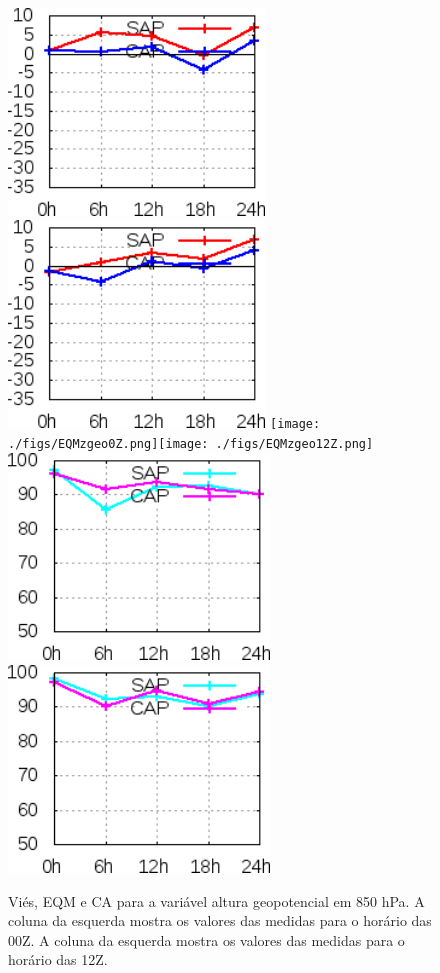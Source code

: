 \begin{figure}[!hbp]
\includegraphics[height=5.5cm]{./figs/VIES850zgeo0Z.png}\includegraphics[height=5.5cm]{./figs/VIES850zgeo12Z.png}
\texttt{[image: ./figs/EQMzgeo0Z.png]}\texttt{[image: ./figs/EQMzgeo12Z.png]}
\includegraphics[height=5.5cm]{./figs/CA850zgeo0Z.png}\includegraphics[height=5.5cm]{./figs/CA850zgeo12Z.png}
\caption{Viés, EQM e CA para a variável altura geopotencial em 850 hPa. A coluna da esquerda mostra os valores das medidas para o horário das 00Z. A coluna da esquerda mostra os valores das medidas para o horário das 12Z.}
\label{fig53}
\end{figure}

